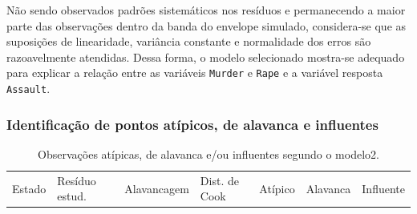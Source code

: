\documentclass[a4paper]{modeloUFCG} %
\begin{document}
Não sendo observados padrões sistemáticos nos resíduos e permanecendo a maior parte das observações dentro da banda do envelope simulado, considera-se que as suposições de linearidade, variância constante e normalidade dos erros são razoavelmente atendidas. Dessa forma, o modelo selecionado mostra-se adequado para explicar a relação entre as variáveis \texttt{Murder} e \texttt{Rape} e a variável resposta \texttt{Assault}.

\subsubsection{Identificação de pontos atípicos, de alavanca e influentes}\label{identificauxe7uxe3o-de-pontos-atuxedpicos-de-alavanca-e-influentes}

\begin{longtable}[]{@{}
  >{\raggedright\arraybackslash}p{}
  >{\raggedleft\arraybackslash}p{}
  >{\raggedleft\arraybackslash}p{}
  >{\raggedleft\arraybackslash}p{}
  >{\raggedright\arraybackslash}p{}
  >{\raggedright\arraybackslash}p{}
  >{\raggedright\arraybackslash}p{}@{}}
\caption{\label{tab:pontosInfluentes} Observações atípicas, de alavanca e/ou influentes segundo o modelo2.}\tabularnewline
\toprule\noalign{}
\begin{minipage}[b]{\linewidth}\raggedright
Estado
\end{minipage} & \begin{minipage}[b]{\linewidth}\raggedleft
Resíduo estud.
\end{minipage} & \begin{minipage}[b]{\linewidth}\raggedleft
Alavancagem
\end{minipage} & \begin{minipage}[b]{\linewidth}\raggedleft
Dist. de Cook
\end{minipage} & \begin{minipage}[b]{\linewidth}\raggedright
Atípico
\end{minipage} & \begin{minipage}[b]{\linewidth}\raggedright
Alavanca
\end{minipage} & \begin{minipage}[b]{\linewidth}\raggedright
Influente
\end{minipage} \\

\end{longtable}
\end{document}
